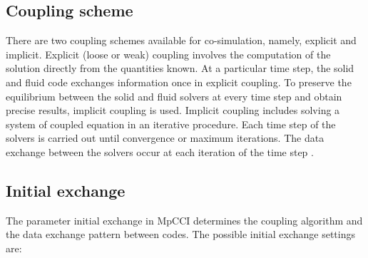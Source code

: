 \subsection{Coupling scheme}

There are two coupling schemes available for co-simulation, namely, explicit and implicit. Explicit (loose or weak) coupling involves the computation of the solution directly from the quantities known. At a particular time step, the solid and fluid code exchanges information once in explicit coupling. 
To preserve the equilibrium between the solid and fluid solvers at every time step and obtain precise results, implicit coupling is used. Implicit coupling includes solving a system of coupled equation in an iterative procedure. Each time step of the solvers is carried out until convergence or maximum iterations. The data exchange between the solvers occur at each iteration of the time step \cite{couplingscheme}.

\subsection{Initial exchange}

The parameter initial exchange in MpCCI determines the coupling algorithm and the data exchange pattern between codes. The possible initial exchange settings are:


